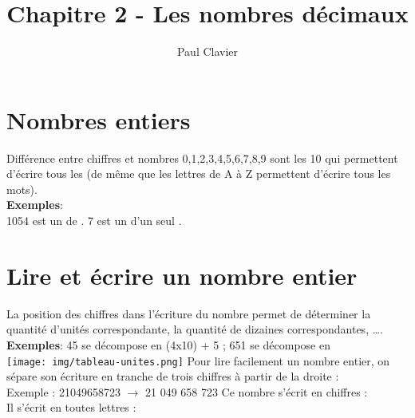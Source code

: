 \documentclass[12pt,a4paper]{article}
\author{Paul Clavier}
\title{Chapitre 2 - Les nombres décimaux}
\begin{document}
\renewcommand\thesection{\Roman{section}}
\renewcommand\thesubsection{\arabic{subsection}}


\ifdefined\isprof
	\TeacherModeOn
\fi




\begin{center}
\end{center}

\section{Nombres entiers}

\begin{definition}{Différence entre chiffres et nombres}
0,1,2,3,4,5,6,7,8,9 sont les 10  qui permettent d'écrire tous les  (de même que les lettres de A à Z permettent d'écrire tous les mots).\\
\textbf{Exemples}:\\
1054 est un  de . 7 est un  d'un seul .
\end{definition}

\section{Lire et écrire un nombre entier}
La position des chiffres dans l'écriture du nombre permet de déterminer la quantité d'unités correspondante, la quantité de dizaines correspondantes, ….\\
\textbf{Exemples}: 45 se décompose en (4x10) + 5 ; 651 se décompose en \\
\texttt{[image: img/tableau-unites.png]} 
Pour lire facilement un nombre entier, on sépare son écriture en tranche de trois chiffres à partir de la droite :\\
Exemple : 21049658723 $\rightarrow$ 21 049 658 723
Ce nombre s'écrit en chiffres : \\
Il s'écrit en toutes lettres :
\end{document}
